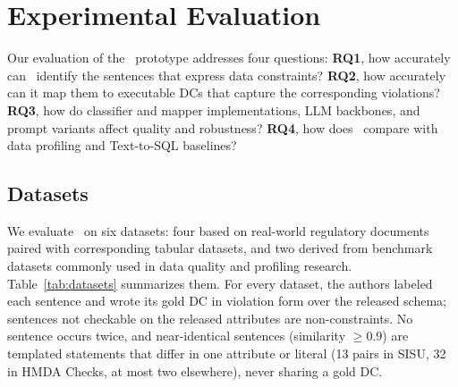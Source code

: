 


\section{Experimental Evaluation}
\label{sec:experiments}

Our evaluation of the \system\ prototype addresses four questions: \textbf{RQ1}, how accurately can \system\ identify the sentences that express data constraints? \textbf{RQ2}, how accurately can it map them to executable DCs that capture the corresponding violations? \textbf{RQ3}, how do classifier and mapper implementations, LLM backbones, and prompt variants affect quality and robustness? \textbf{RQ4}, how does \system\ compare with data profiling and Text-to-SQL baselines?

\subsection{Datasets}
\label{sec:datasets}



We evaluate \system\ on six datasets: four based on real-world regulatory documents paired with corresponding tabular datasets, and two derived from benchmark datasets commonly used in data quality and profiling research. Table~\ref{tab:datasets} summarizes them. For every dataset, the authors labeled each sentence and wrote its gold DC in violation form over the released schema; sentences not checkable on the released attributes are non-constraints. No sentence occurs twice, and near-identical sentences (similarity $\geq 0.9$) are templated statements that differ in one attribute or literal (13 pairs in SISU, 32 in HMDA Checks, at most two elsewhere), never sharing a gold DC.



